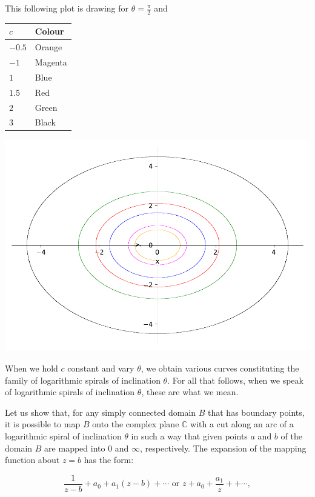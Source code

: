 \documentclass[
]{book}
\theoremstyle{definition}
\theoremstyle{definition}
\theoremstyle{definition}
\theoremstyle{definition}
\theoremstyle{remark}
\begin{document}
This following plot is drawing for \(\theta=\frac{\pi}{2}\) and

\begin{longtable}[]{@{}ll@{}}
\toprule\noalign{}
\(c\) & Colour \\
\midrule\noalign{}
\endhead
\bottomrule\noalign{}
\endlastfoot
\(-0.5\) & Orange \\
\(-1\) & Magenta \\
\(1\) & Blue \\
\(1.5\) & Red \\
\(2\) & Green \\
\(3\) & Black \\
\end{longtable}

\includegraphics{ConformalMapping_files/figure-latex/unnamed-chunk-69-1.pdf}

When we hold \(c\) constant and vary \(\theta\), we obtain various curves constituting the family of logarithmic spirals of inclination \(\theta\). For all that follows, when we speak of logarithmic spirals of inclination \(\theta\), these are what we mean.

Let us show that, for any simply connected domain \(B\) that has boundary points, it is possible to map \(B\) onto the complex plane \(\mathbb{C}\) with a cut along an arc of a logarithmic spiral of inclination \(\theta\) in such a way that given points \(a\) and \(b\) of the domain \(B\) are mapped into \(0\) and \(\infty\), respectively. The expansion of the mapping function about \(z = b\) has the form:

\[ \frac{1}{z - b} +a_0+a_1{(z - b)} +\cdots\text{ or }  z+a_0+\frac{a_1}{z} +  + \cdots, \]
\end{document}

